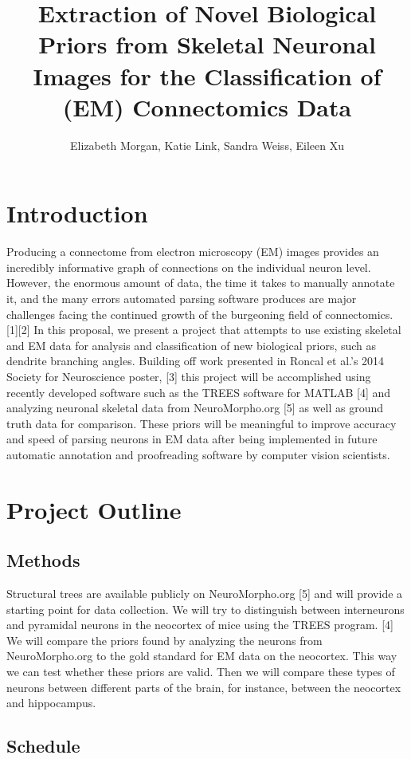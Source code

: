 \documentclass[11pt]{article} %
\title{Extraction of Novel Biological Priors from Skeletal Neuronal Images for the Classification of (EM) Connectomics Data}
\author{Elizabeth Morgan, Katie Link, Sandra Weiss, Eileen Xu}
\begin{document}
\maketitle

\section{Introduction}
Producing a connectome from electron microscopy (EM) images provides an incredibly informative graph of connections on the individual neuron level. However, the enormous amount of data, the time it takes to manually annotate it, and the many errors automated parsing software produces are major challenges facing the continued growth of the burgeoning field of connectomics. [1][2] In this proposal, we present a project that attempts to use existing skeletal and EM data for analysis and classification of new biological priors, such as dendrite branching angles. Building off work presented in Roncal et al.'s 2014 Society for Neuroscience poster, [3] this project will be accomplished using recently developed software such as the TREES software for MATLAB [4] and analyzing neuronal skeletal data from NeuroMorpho.org [5] as well as ground truth data for comparison. These priors will be meaningful to improve accuracy and speed of parsing neurons in EM data after being implemented in future automatic annotation and proofreading software by computer vision scientists. \\


\section{Project Outline}
\subsection{Methods}
Structural trees are available publicly on NeuroMorpho.org [5] and will provide a starting point for data collection. We will try to distinguish between interneurons and pyramidal neurons in the neocortex of mice using the TREES program. [4] We will compare the priors found by analyzing the neurons from NeuroMorpho.org to the gold standard for EM data on the neocortex. This way we can test whether these priors are valid. Then we will compare these types of neurons between different parts of the brain, for instance, between the neocortex and hippocampus. 

\subsection{Schedule}
\end{document}
